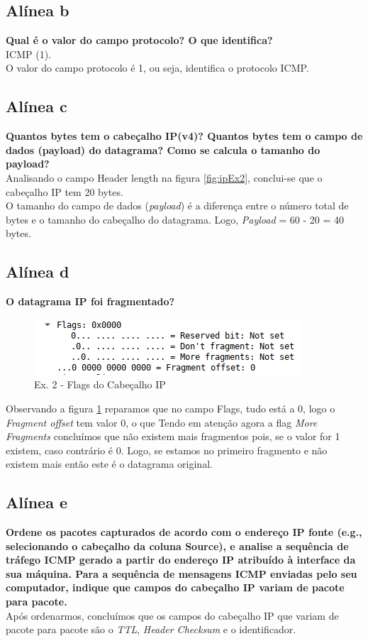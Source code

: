 \documentclass[a4paper]{report}
\begin{document}
\subsection{Alínea b}
\textbf{Qual é o valor do campo protocolo? O que identifica?}\\
ICMP (1).\\
O valor do campo protocolo é 1, ou seja, identifica o protocolo ICMP.

\subsection{Alínea c}
\textbf{Quantos bytes tem o cabeçalho IP(v4)? Quantos bytes tem o campo de dados
(payload) do datagrama? Como se calcula o tamanho 
do payload?}\\
Analisando o campo Header length na figura \ref{fig:ipEx2}, conclui-se que o
cabeçalho IP tem 20 bytes.\\
O tamanho do campo de dados (\textit{payload}) é a diferença entre o número 
total de bytes e o tamanho do cabeçalho do datagrama. Logo, \textit{Payload} =
60 - 20 = 40 bytes.

\subsection{Alínea d}
\textbf{O datagrama IP foi fragmentado? }

\begin{figure}[H]
    \centering 
    \includegraphics[width=\textwidth]{images/ipEx2Flags.png}
    \caption{Ex. 2 - Flags do Cabeçalho IP}
    \label{fig:ipEx2Flags}
\end{figure}
Observando a figura \ref{fig:ipEx2Flags} reparamos que no campo Flags, tudo está
a 0, logo o \textit{Fragment offset} tem valor 0, o que Tendo em atenção agora a
flag \textit{More Fragments} concluímos que não existem mais fragmentos pois, se
o valor for 1 existem, caso contrário é 0. Logo, se estamos no primeiro
fragmento e não existem mais então este é o datagrama original.

\subsection{Alínea e}
\textbf{Ordene os pacotes capturados de acordo com o endereço IP fonte (e.g.,
selecionando o cabeçalho da coluna Source), e analise a sequência de tráfego
ICMP gerado a partir  do endereço IP atribuído à interface da sua máquina. Para
a sequência de mensagens ICMP enviadas pelo seu computador, indique que campos
do cabeçalho IP variam de pacote para pacote.}\\
Após ordenarmos, concluímos que os campos do cabeçalho IP que variam de pacote
para pacote são o \textit{TTL}, \textit{Header Checksum} e o identificador.
\end{document}
